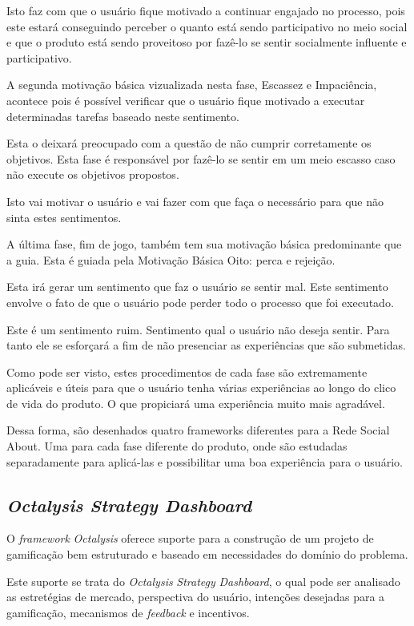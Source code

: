 Isto faz com que o usuário fique motivado a continuar engajado no processo, pois
este estará conseguindo perceber o quanto está sendo participativo no meio social
e que o produto está sendo proveitoso por fazê-lo se sentir socialmente influente
e participativo.


A segunda motivação básica vizualizada nesta fase, Escassez e Impaciência, acontece
pois é possível verificar que o usuário fique motivado a executar determinadas
tarefas baseado neste sentimento.

Esta o deixará preocupado com a questão de não cumprir corretamente os objetivos.
Esta fase é responsável por fazê-lo se sentir em um meio escasso caso não execute
os objetivos propostos.

Isto vai motivar o usuário e vai fazer com que faça o necessário para que não
sinta estes sentimentos.

A última fase, fim de jogo, também tem sua motivação básica predominante que
a guia. Esta é guiada pela Motivação Básica Oito: perca e rejeição.

Esta irá gerar um sentimento que faz o usuário se sentir mal. Este sentimento
envolve o fato de que o usuário pode perder todo o processo que foi executado.



Este é um sentimento ruim. Sentimento qual o usuário não deseja sentir. Para tanto
ele se esforçará a fim de não presenciar as experiências que são submetidas.

Como pode ser visto, estes procedimentos de cada fase são extremamente aplicáveis
e úteis para que o usuário tenha várias experiências ao longo do clico de vida do
produto. O que propiciará uma experiência muito mais agradável.

Dessa forma, são desenhados quatro frameworks diferentes para a Rede Social About.
Uma para cada fase diferente do produto, onde são estudadas separadamente para
aplicá-las e possibilitar uma boa experiência para o usuário.

\subsection{\textit{Octalysis Strategy Dashboard}}
\label{sec:octalysisdashborad}
O \textit{framework} \textit{Octalysis} oferece suporte para a construção de um projeto de gamificação
bem estruturado e baseado em necessidades do domínio do problema.

Este suporte se trata do \textit{Octalysis} \textit{Strategy} \textit{Dashboard}, o qual pode ser analisado
 as
estretégias de mercado, perspectiva do usuário, intenções desejadas para a gamificação,
mecanismos de \textit{feedback} e incentivos.


